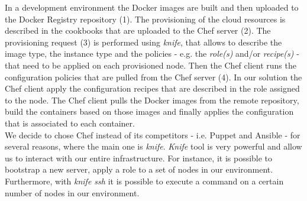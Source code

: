 In a development environment the Docker images are built and then uploaded to the Docker Registry
repository (1). The provisioning of the cloud resources is described in the cookbooks that are uploaded
to the Chef server (2). The provisioning request (3) is performed using \textit{knife}, that allows to
describe the image type, the instance type and the policies - e.g. the \textit{role(s)} and/or \textit{recipe(s)} -
that need to be applied on each provisioned node. Then the Chef client runs the configuration policies
that are pulled from the Chef server (4). In our solution the Chef client apply the configuration recipes
that are described in the role assigned to the node. The Chef client pulls the Docker images from the
remote repository, build the containers based on those images and finally applies the configuration
that is associated to each container.\\

We decide to chose Chef instead of its competitors - i.e. Puppet and Ansible - for several
reasons, where the main one is \textit{knife}. \textit{Knife} tool is very powerful and allow us to
interact with our entire infrastructure. For instance, it is possible to bootstrap a new server,
apply a role to a set of nodes in our environment. Furthermore, with \textit{knife ssh} it is
possible to execute a command on a certain number of nodes in our environment.\\
